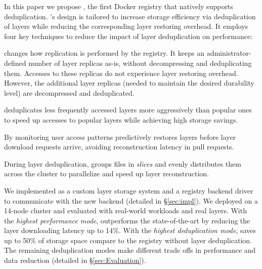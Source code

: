 In this paper we propose \sysname, the first Docker registry that natively
supports deduplication.
%
\sysname's design is tailored to
increase storage efficiency via deduplication of layers while
reducing the corresponding layer restoring overhead.
%
It employs four key techniques to reduce
the impact of layer deduplication on performance: 
%
%
\begin{compactenumerate}
\item 
\sysname changes how replication is performed by the registry.
%
It keeps an administrator-defined
number of layer replicas as-is, without decompressing and deduplicating them.
%
Accesses to these replicas do not experience layer restoring overhead.
%
However, the additional layer replicas (needed
to maintain the desired durability level)
are decompressed and deduplicated.

\item \sysname deduplicates less frequently accessed layers more
aggressively than popular ones to speed up accesses to popular
layers while achieving high storage savings.
%
\item By monitoring user access patterns \sysname predictively
restores layers before layer download requests arrive,
avoiding reconstruction latency in pull requests.
%
\item During layer deduplication, \sysname groups files in \emph{slices} and evenly
distributes them across the cluster to parallelize and speed up layer reconstruction.
%
\end{compactenumerate}


We implemented \sysname as a custom layer storage system and
a registry backend driver to communicate
with the new backend (detailed in \S\ref{sec:impl}).
%
We deployed \sysname on a 14-node cluster and evaluated with real-world
workloads and real layers.
%
With the \emph{highest performance mode}, \sysname outperforms the
state-of-the-art by reducing the layer downloading latency up to 14\%.
%
With the \emph{highest deduplication mode}, \sysname saves up to 50\% of
storage space compare to the registry without layer deduplication.
%
%
The remaining deduplication modes make different trade offs in performance and
data reduction (detailed in \S\ref{sec:Evaluation}).

%
